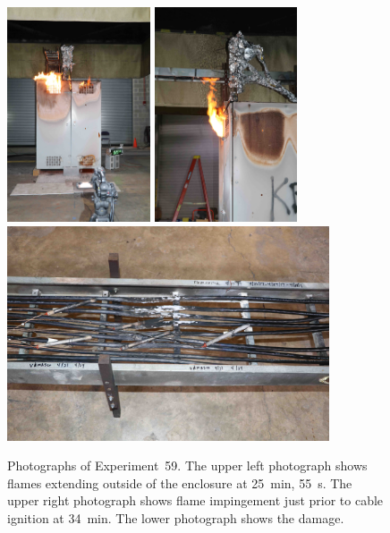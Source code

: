 \begin{figure}[p]
\centering
\includegraphics[height=2.50in,angle=-90]{../FIGURES/Test_59_25_min_55_s}
\includegraphics[height=2.50in,angle=-90]{../FIGURES/Test_59_side} \\
\includegraphics[height=2.50in]{../FIGURES/Test_59_scar}
\caption[Photographs of Experiment~59]{Photographs of Experiment~59. The upper left photograph shows flames extending outside of the enclosure at 25~min, 55~s. The upper right photograph shows flame impingement just prior to cable ignition at 34~min. The lower photograph shows the damage.}
\label{fig:Test_59_photos}
\end{figure}


\clearpage

